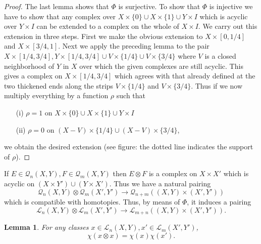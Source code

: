 \documentclass[leqno]{book}
\numberwithin{equation}{section}
\newtheorem{lemma}[theorem]{Lemma}
\theoremstyle{definition}
\begin{document}
            \begin{proof}
              The last lemma shows that $\Phi$ is surjective. To show that $\Phi$ is injective we have to show that any complex over $X\times \{0\} \cup X\times \{1\}\cup Y \times I$ which is acyclic over $Y\times I$ can be extended to a complex on the whole of $X\times I$. We carry out this extension in three steps. First we make the obvious extension to $X\times [0,1/4]$ and $X\times [3/4,1]$. Next we apply the preceding lemma to the pair $X\times [1/4, 3/4], Y\times [1/4,3/4]\cup V\times \{1/4\}\cup V\times \{3/4\}$ where $V$ is a closed neighborhood of $Y$ in $X$ over which the given complexes are still acyclic. This gives a complex on $X\times [1/4,3/4]$ which agrees with that already defined at the two thickened ends along the strips $V\times \{1/4\}$ and $V\times \{3/4\}$. Thus if we now multiply everything by a function $\rho$ such that 
              \begin{itemize}
                \item[(i)]  $\rho=1$ on $X\times \{0\}\cup X\times \{1\} \cup Y\times I$
                \item[(ii)] $\rho=0$ on $(X-V)\times\{1/4\}\cup (X-V)\times\{3/4\}$,
              \end{itemize}
              we obtain the desired extension (see figure: the dotted line indicates the support of $\rho$).
            \end{proof}

            If $E\in \mathcal{Q}_{n}(X,Y),F \in \mathcal{Q}_{m}(X,Y)$ then $E\otimes  F$ is a complex on $X\times X'$ which is acyclic on $(X\times Y')\cup (Y\times X')$. Thus we have a natural pairing
            \begin{equation*}
              \mathcal{Q}_{n}(X,Y)\otimes \mathcal{Q}_{m}(X',Y')\to \mathcal{Q}_{n+m}((X,Y)\times (X',Y'))
            \end{equation*}
            which is compatible with homotopies. Thus, by means of $\Phi$, it induces a pairing 
            \begin{equation*}
              \mathcal{L}_{n}(X,Y)\otimes \mathcal{L}_{m}(X',Y')\rightarrow \mathcal{L}_{m+n}((X,Y)\times (X',Y')).
            \end{equation*}

            \begin{lemma}
              For any classes $x\in \mathcal{L}_{n}(X,Y),x'\in \mathcal{L}_{m}(X',Y')$,
              \begin{equation*}
                \chi(x\otimes x)=\chi(x)\chi(x').
              \end{equation*}
            \end{lemma}
\end{document}
